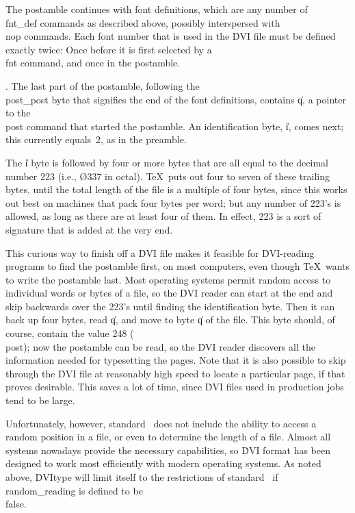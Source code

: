 The postamble continues with font definitions, which are any number of
\\{fnt\_def} commands as described above, possibly interspersed with \\{nop}
commands. Each font number that is used in the \.{DVI} file must be defined
exactly twice: Once before it is first selected by a \\{fnt} command, and once
in the postamble.

\fi

. The last part of the postamble, following the \\{post\_post} byte that
signifies the end of the font definitions, contains \|q, a pointer to the
\\{post} command that started the postamble.  An identification byte, \|i,
comes next; this currently equals~2, as in the preamble.

The \|i byte is followed by four or more bytes that are all equal to
the decimal number 223 (i.e., \O{337} in octal). \TeX\ puts out four to seven
of
these trailing bytes, until the total length of the file is a multiple of
four bytes, since this works out best on machines that pack four bytes per
word; but any number of 223's is allowed, as long as there are at least four
of them. In effect, 223 is a sort of signature that is added at the very end.

This curious way to finish off a \.{DVI} file makes it feasible for
\.{DVI}-reading programs to find the postamble first, on most computers,
even though \TeX\ wants to write the postamble last. Most operating
systems permit random access to individual words or bytes of a file, so
the \.{DVI} reader can start at the end and skip backwards over the 223's
until finding the identification byte. Then it can back up four bytes, read
\|q, and move to byte \|q of the file. This byte should, of course,
contain the value 248 (\\{post}); now the postamble can be read, so the
\.{DVI} reader discovers all the information needed for typesetting the
pages. Note that it is also possible to skip through the \.{DVI} file at
reasonably high speed to locate a particular page, if that proves
desirable. This saves a lot of time, since \.{DVI} files used in production
jobs tend to be large.

Unfortunately, however, standard \PASCAL\ does not include the ability to
access a random position in a file, or even to determine the length of a file.
Almost all systems nowadays provide the necessary capabilities, so \.{DVI}
format has been designed to work most efficiently with modern operating
systems.
As noted above, \.{DVItype} will limit itself to the restrictions of standard
\PASCAL\ if \\{random\_reading} is defined to be \\{false}.

